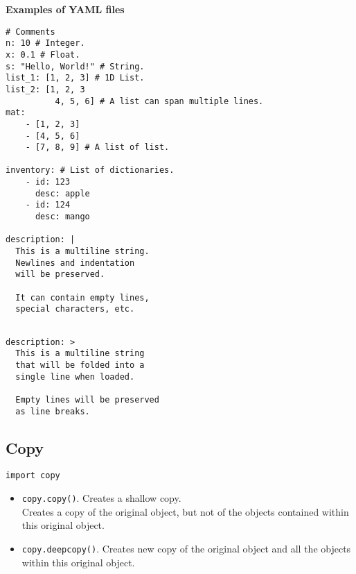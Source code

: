 \textbf{Examples of YAML files}

\begin{mdframed}[backgroundcolor=gray!10,linecolor=Firebrick4]
\begin{verbatim}
# Comments
n: 10 # Integer.
x: 0.1 # Float.
s: "Hello, World!" # String.
list_1: [1, 2, 3] # 1D List.
list_2: [1, 2, 3
          4, 5, 6] # A list can span multiple lines.
mat:
    - [1, 2, 3]
    - [4, 5, 6]
    - [7, 8, 9] # A list of list.

inventory: # List of dictionaries.
    - id: 123
      desc: apple
    - id: 124
      desc: mango

description: |
  This is a multiline string.
  Newlines and indentation
  will be preserved.
  
  It can contain empty lines,
  special characters, etc.

\end{verbatim}
\end{mdframed}

\columnbreak


\begin{mdframed}[backgroundcolor=gray!10,linecolor=Firebrick4]
\begin{verbatim}

description: >
  This is a multiline string
  that will be folded into a
  single line when loaded.
  
  Empty lines will be preserved
  as line breaks.
\end{verbatim}
\end{mdframed}



\subsection{Copy}

\texttt{import copy}

\begin{itemize}
\item \texttt{copy.copy()}. Creates a shallow copy.\\
        Creates a copy of the original object, 
        but not of the objects contained within this original object.\\
\item \texttt{copy.deepcopy()}. Creates new copy of the original object
        and all the objects within this original object.\\
\end{itemize}



